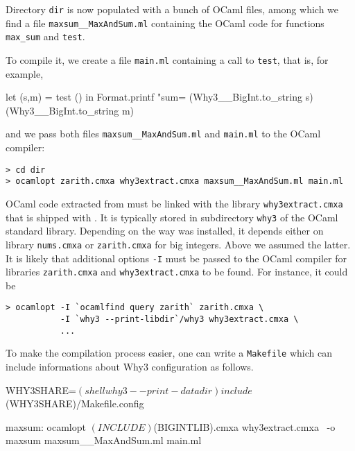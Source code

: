 Directory \texttt{dir} is now populated with a bunch of OCaml files,
among which we find a file \texttt{maxsum\_\_MaxAndSum.ml} containing
the OCaml code for functions \texttt{max\_sum} and \texttt{test}.

To compile it, we create a file \texttt{main.ml}
containing a call to \texttt{test}, that is, for example,
\begin{whycode}
  let (s,m) = test () in
  Format.printf "sum=%
    (Why3__BigInt.to_string s) (Why3__BigInt.to_string m)
\end{whycode}
and we pass both files \texttt{maxsum\_\_MaxAndSum.ml} and
\texttt{main.ml} to the OCaml compiler:
\begin{verbatim}
> cd dir
> ocamlopt zarith.cmxa why3extract.cmxa maxsum__MaxAndSum.ml main.ml
\end{verbatim}
OCaml code extracted from \why must be linked with the library
\texttt{why3extract.cmxa} that is shipped with \why. It is typically
stored in subdirectory \texttt{why3} of the OCaml standard library.
Depending on the way \why was installed, it depends either on library
\texttt{nums.cmxa} or \texttt{zarith.cmxa} for big integers. Above we
assumed the latter. It is likely that additional options \texttt{-I}
must be passed to the OCaml compiler for libraries
\texttt{zarith.cmxa} and \texttt{why3extract.cmxa} to be found.
For instance, it could be
\begin{verbatim}
> ocamlopt -I `ocamlfind query zarith` zarith.cmxa \
           -I `why3 --print-libdir`/why3 why3extract.cmxa \
           ...
\end{verbatim}
To make the compilation process easier, one can write a
\texttt{Makefile} which can include informations about Why3
configuration as follows.
\begin{whycode}
WHY3SHARE=$(shell why3 --print-datadir)

include $(WHY3SHARE)/Makefile.config

maxsum:
        ocamlopt $(INCLUDE) $(BIGINTLIB).cmxa why3extract.cmxa \
                -o maxsum maxsum__MaxAndSum.ml main.ml
\end{whycode}



